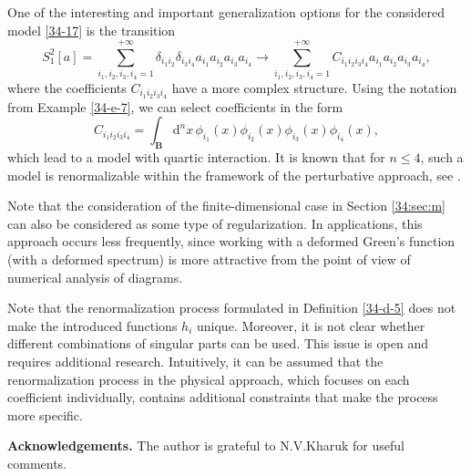 \documentclass[a4paper]{article}
\begin{document}
One of the interesting and important generalization options for the considered model \eqref{34-17} is the transition
\begin{equation*}
S_1^2[a]=
\sum_{i_1,i_2,i_3,i_4=1}^{+\infty}\delta_{i_1i_2}\delta_{i_3i_4}a_{i_1}a_{i_2}a_{i_3}a_{i_4}\to
\sum_{i_1,i_2,i_3,i_4=1}^{+\infty}C_{i_1i_2i_3i_4}a_{i_1}a_{i_2}a_{i_3}a_{i_4},
\end{equation*}
where the coefficients $C_{i_1i_2i_3i_4}$ have a more complex structure. Using the notation from Example \ref{34-e-7}, we can select coefficients in the form
\begin{equation*}
C_{i_1i_2i_3i_4}=\int_{\mathbf{B}}\mathrm{d}^nx\,\phi_{i_1}(x)\phi_{i_2}(x)\phi_{i_3}(x)\phi_{i_4}(x),
\end{equation*}
which lead to a model with quartic interaction. It is known that for $n\leqslant4$, such a model is renormalizable within the framework of the perturbative approach, see \cite{29-3,29-4,Iv-2024-1,Kh-2024}. 

Note that the consideration of the finite-dimensional case in Section \ref{34:sec:m} can also be considered as some type of regularization. In applications, this approach occurs less frequently, since working with a deformed Green's function (with a deformed spectrum) is more attractive from the point of view of numerical analysis of diagrams.

Note that the renormalization process formulated in Definition \ref{34-d-5} does not make the introduced functions $h_i$ unique. Moreover, it is not clear whether different combinations of singular parts can be used. This issue is open and requires additional research. Intuitively, it can be assumed that the renormalization process in the physical approach, which focuses on each coefficient individually, contains additional constraints that make the process more specific.

\vspace{2mm}
\noindent\textbf{Acknowledgements.} The author is grateful to N.V.Kharuk for useful comments.
\end{document}
